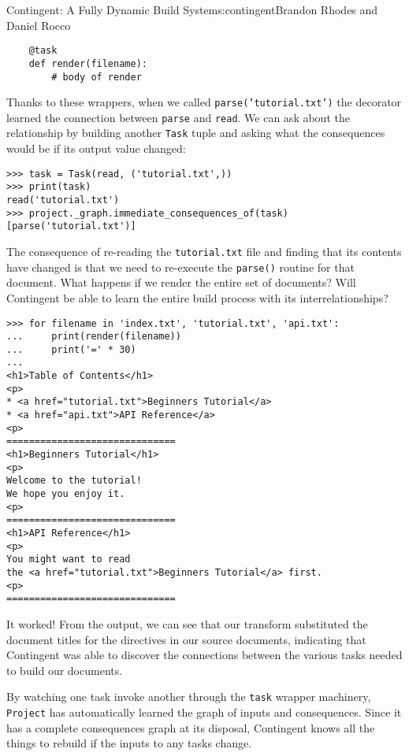 \begin{aosachapter}{Contingent: A Fully Dynamic Build System}{s:contingent}{Brandon Rhodes and Daniel Rocco}
\begin{verbatim}
    @task
    def render(filename):
        # body of render
\end{verbatim}

Thanks to these wrappers, when we called \texttt{parse('tutorial.txt')}
the decorator learned the connection between \texttt{parse} and
\texttt{read}. We can ask about the relationship by building another
\texttt{Task} tuple and asking what the consequences would be if its
output value changed:

\begin{verbatim}
>>> task = Task(read, ('tutorial.txt',))
>>> print(task)
read('tutorial.txt')
>>> project._graph.immediate_consequences_of(task)
[parse('tutorial.txt')]
\end{verbatim}

The consequence of re-reading the \texttt{tutorial.txt} file and finding
that its contents have changed is that we need to re-execute the
\texttt{parse()} routine for that document. What happens if we render
the entire set of documents? Will Contingent be able to learn the entire
build process with its interrelationships?

\begin{verbatim}
>>> for filename in 'index.txt', 'tutorial.txt', 'api.txt':
...     print(render(filename))
...     print('=' * 30)
...
<h1>Table of Contents</h1>
<p>
* <a href="tutorial.txt">Beginners Tutorial</a>
* <a href="api.txt">API Reference</a>
<p>
==============================
<h1>Beginners Tutorial</h1>
<p>
Welcome to the tutorial!
We hope you enjoy it.
<p>
==============================
<h1>API Reference</h1>
<p>
You might want to read
the <a href="tutorial.txt">Beginners Tutorial</a> first.
<p>
==============================
\end{verbatim}

It worked! From the output, we can see that our transform substituted
the document titles for the directives in our source documents,
indicating that Contingent was able to discover the connections between
the various tasks needed to build our documents.


By watching one task invoke another through the \texttt{task} wrapper
machinery, \texttt{Project} has automatically learned the graph of
inputs and consequences. Since it has a complete consequences graph at
its disposal, Contingent knows all the things to rebuild if the inputs
to any tasks change.


\end{aosachapter}
